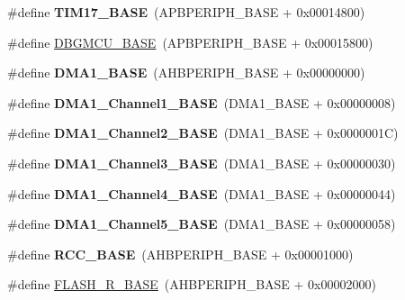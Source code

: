 \begin{DoxyCompactItemize}
\#define {\bfseries T\+I\+M17\+\_\+\+B\+A\+SE}~(A\+P\+B\+P\+E\+R\+I\+P\+H\+\_\+\+B\+A\+SE + 0x00014800)
\item 
\#define \hyperlink{group___peripheral__memory__map_ga4adaf4fd82ccc3a538f1f27a70cdbbef}{D\+B\+G\+M\+C\+U\+\_\+\+B\+A\+SE}~(A\+P\+B\+P\+E\+R\+I\+P\+H\+\_\+\+B\+A\+SE + 0x00015800)
\item 
\mbox{\label{group___peripheral__memory__map_gab2d8a917a0e4ea99a22ac6ebf279bc72}} 
\#define {\bfseries D\+M\+A1\+\_\+\+B\+A\+SE}~(A\+H\+B\+P\+E\+R\+I\+P\+H\+\_\+\+B\+A\+SE + 0x00000000)
\item 
\mbox{\label{group___peripheral__memory__map_ga888dbc1608243badeb3554ffedc7364c}} 
\#define {\bfseries D\+M\+A1\+\_\+\+Channel1\+\_\+\+B\+A\+SE}~(D\+M\+A1\+\_\+\+B\+A\+SE + 0x00000008)
\item 
\mbox{\label{group___peripheral__memory__map_ga38a70090eef3687e83fa6ac0c6d22267}} 
\#define {\bfseries D\+M\+A1\+\_\+\+Channel2\+\_\+\+B\+A\+SE}~(D\+M\+A1\+\_\+\+B\+A\+SE + 0x0000001\+C)
\item 
\mbox{\label{group___peripheral__memory__map_ga70b3d9f36ca9ce95b4e421c11154fe5d}} 
\#define {\bfseries D\+M\+A1\+\_\+\+Channel3\+\_\+\+B\+A\+SE}~(D\+M\+A1\+\_\+\+B\+A\+SE + 0x00000030)
\item 
\mbox{\label{group___peripheral__memory__map_ga1adc93cd0baf0897202c71110e045692}} 
\#define {\bfseries D\+M\+A1\+\_\+\+Channel4\+\_\+\+B\+A\+SE}~(D\+M\+A1\+\_\+\+B\+A\+SE + 0x00000044)
\item 
\mbox{\label{group___peripheral__memory__map_gac041a71cd6c1973964f847a68aa14478}} 
\#define {\bfseries D\+M\+A1\+\_\+\+Channel5\+\_\+\+B\+A\+SE}~(D\+M\+A1\+\_\+\+B\+A\+SE + 0x00000058)
\item 
\mbox{\label{group___peripheral__memory__map_ga0e681b03f364532055d88f63fec0d99d}} 
\#define {\bfseries R\+C\+C\+\_\+\+B\+A\+SE}~(A\+H\+B\+P\+E\+R\+I\+P\+H\+\_\+\+B\+A\+SE + 0x00001000)
\item 
\#define \hyperlink{group___peripheral__memory__map_ga8e21f4845015730c5731763169ec0e9b}{F\+L\+A\+S\+H\+\_\+\+R\+\_\+\+B\+A\+SE}~(A\+H\+B\+P\+E\+R\+I\+P\+H\+\_\+\+B\+A\+SE + 0x00002000)

\end{DoxyCompactItemize}
